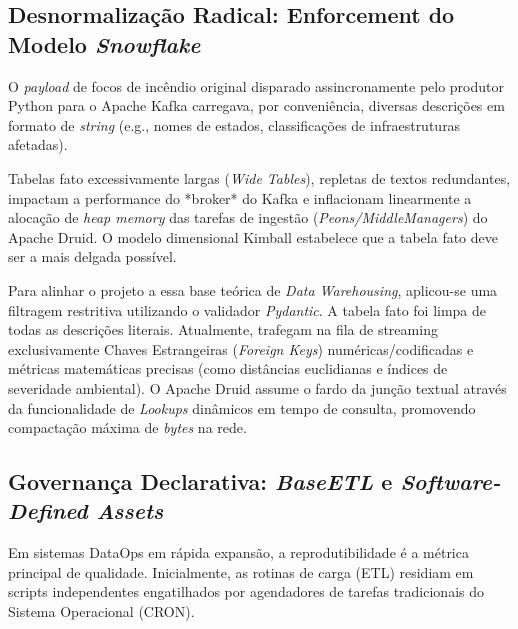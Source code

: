 \documentclass[12pt]{article}
\begin{document}
\subsection{Desnormalização Radical: Enforcement do Modelo \textit{Snowflake}}
O \textit{payload} de focos de incêndio original disparado assincronamente pelo produtor Python para o Apache Kafka carregava, por conveniência, diversas descrições em formato de \textit{string} (e.g., nomes de estados, classificações de infraestruturas afetadas).

Tabelas fato excessivamente largas (\textit{Wide Tables}), repletas de textos redundantes, impactam a performance do *broker* do Kafka e inflacionam linearmente a alocação de \textit{heap memory} das tarefas de ingestão (\textit{Peons/MiddleManagers}) do Apache Druid. O modelo dimensional Kimball estabelece que a tabela fato deve ser a mais delgada possível.

Para alinhar o projeto a essa base teórica de \textit{Data Warehousing}, aplicou-se uma filtragem restritiva utilizando o validador \textit{Pydantic}. A tabela fato foi limpa de todas as descrições literais. Atualmente, trafegam na fila de streaming exclusivamente Chaves Estrangeiras (\textit{Foreign Keys}) numéricas/codificadas e métricas matemáticas precisas (como distâncias euclidianas e índices de severidade ambiental). O Apache Druid assume o fardo da junção textual através da funcionalidade de \textit{Lookups} dinâmicos em tempo de consulta, promovendo compactação máxima de \textit{bytes} na rede.

\subsection{Governança Declarativa: \textit{BaseETL} e \textit{Software-Defined Assets}}
Em sistemas DataOps em rápida expansão, a reprodutibilidade é a métrica principal de qualidade. Inicialmente, as rotinas de carga (ETL) residiam em scripts independentes engatilhados por agendadores de tarefas tradicionais do Sistema Operacional (CRON).
\end{document}
